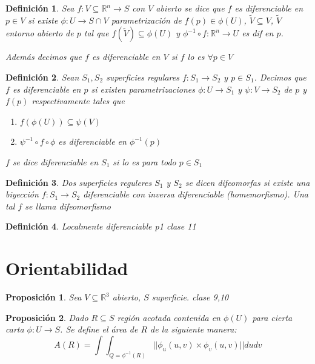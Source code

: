 \documentclass[12pt]{book}
\theoremstyle{break}
\newtheorem{proposition}{Proposición}
\newtheorem{definition}{Definición}[section]
\begin{document}
\begin{definition}
    Sea $f:V \subseteq \mathbb{R}^n\rightarrow S$ con $V$ abierto se dice que $f$ es diferenciable en $p\in V$
    si existe $\phi:U\rightarrow S\cap V$ parametrización de $f(p) \in \phi(U)$, $\tilde{V} \subseteq V$,
    $\tilde{V}$ entorno abierto de $p$ tal que $f(\tilde{V}) \subseteq \phi(U)$ y 
    $\phi^{-1}\circ f: \mathbb{R}^n \rightarrow U$ es
    dif en $p$. 

    Además decimos que $f$ es diferenciable en $V$ si $f$ lo es $\forall p \in V$
\end{definition}

\begin{definition}
    Sean $S_1,S_2$ superficies regulares $f:S_1\rightarrow S_2$ y $p\in S_1$. Decimos que $f$ es 
    diferenciable en $p$ si existen parametrizaciones $\phi:U\rightarrow S_1$ y $\psi:V\rightarrow S_2$
    de $p$ y $f(p)$ respectivamente tales que 
    \begin{enumerate}
        \item $f(\phi(U)) \subseteq \psi(V)$
        \item $\psi^{-1}\circ f \circ \phi $ es diferenciable en $\phi^{-1}(p)$
    \end{enumerate}
    $f$ se dice diferenciable en $S_1$ si lo es para todo $p \in S_1$  
\end{definition}

\begin{definition}
    Dos superficies reguleres $S_1$ y $S_2$ se dicen difeomorfas si existe una biyección $f:S_1\rightarrow S_2$
    diferenciable con inversa diferenciable (homemorfismo). Una tal $f$ se llama difeomorfismo
\end{definition}

\begin{definition}
    Localmente diferenciable p1 clase 11
\end{definition}

\section{Orientabilidad}

\begin{proposition}
  Sea $V \subseteq \mathbb{R}^3 $ abierto, $S$ superficie. clase 9,10
\end{proposition}

\begin{proposition}
    Dado $R \subseteq S$ región acotada contenida en $\phi(U)$ para cierta carta $\phi:U\rightarrow S$. Se 
    define el área de $R$ de la siguiente manera: 
    $$A(R) = \int \int_{Q=\phi^{-1}(R)} ||\phi_u(u,v) \times \phi_v(u,v)||dudv$$
\end{proposition}
\end{document}
